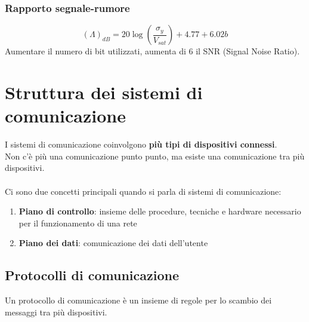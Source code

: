 \documentclass{article}
\begin{document}
\subsubsection{Rapporto segnale-rumore}
$$(\Lambda)_{dB}=20\log(\frac{\sigma_y}{V_{sat}})+4.77+6.02b$$
Aumentare il numero di bit utilizzati, aumenta di 6 il SNR (Signal Noise Ratio).











\newpage
\section{Struttura dei sistemi di comunicazione}
I sistemi di comunicazione coinvolgono \textbf{più tipi di dispositivi connessi}.\\
Non c'è più una comunicazione punto punto, ma esiste una comunicazione tra più dispositivi.\\\\
Ci sono due concetti principali quando si parla di sistemi di comunicazione:
\begin{enumerate}
	\item \textbf{Piano di controllo}: insieme delle procedure, tecniche e hardware necessario per il funzionamento di una rete
	\item \textbf{Piano dei dati}: comunicazione dei dati dell'utente
\end{enumerate}

\subsection{Protocolli di comunicazione}
Un protocollo di comunicazione è un insieme di regole per lo scambio dei messaggi tra più dispositivi.
\end{document}
